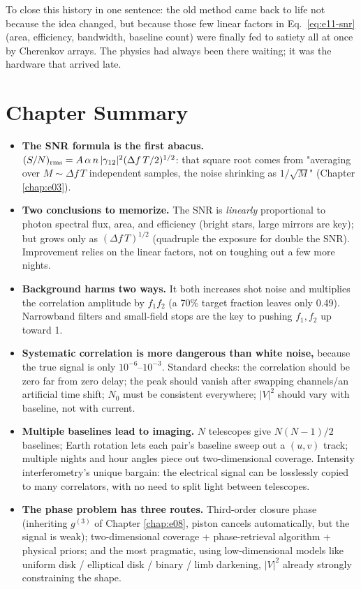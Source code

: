 To close this history in one sentence: the old method came back to life not because the idea changed, but because those few linear factors in Eq.~\eqref{eq:e11-snr} (area, efficiency, bandwidth, baseline count) were finally fed to satiety all at once by Cherenkov arrays. The physics had always been there waiting; it was the hardware that arrived late.

\section{Chapter Summary}
\label{sec:e11-summary}

\begin{itemize}
  \item \textbf{The SNR formula is the first abacus.} \((S/N)_{\rm rms}=A\,\alpha\,n\,|\gamma_{12}|^2(\Delta f\,T/2)^{1/2}\): that square root comes from "averaging over \(M\sim\Delta f\,T\) independent samples, the noise shrinking as \(1/\sqrt{M}\)" (Chapter \ref{chap:e03}).
  \item \textbf{Two conclusions to memorize.} The SNR is \emph{linearly} proportional to photon spectral flux, area, and efficiency (bright stars, large mirrors are key); but grows only as \((\Delta f\,T)^{1/2}\) (quadruple the exposure for double the SNR). Improvement relies on the linear factors, not on toughing out a few more nights.
  \item \textbf{Background harms two ways.} It both increases shot noise and multiplies the correlation amplitude by \(f_1f_2\) (a 70\% target fraction leaves only 0.49). Narrowband filters and small-field stops are the key to pushing \(f_1,f_2\) up toward 1.
  \item \textbf{Systematic correlation is more dangerous than white noise,} because the true signal is only \(10^{-6}\)--\(10^{-3}\). Standard checks: the correlation should be zero far from zero delay; the peak should vanish after swapping channels/an artificial time shift; \(N_0\) must be consistent everywhere; \(|V|^2\) should vary with baseline, not with current.
  \item \textbf{Multiple baselines lead to imaging.} \(N\) telescopes give \(N(N-1)/2\) baselines; Earth rotation lets each pair's baseline sweep out a \((u,v)\) track; multiple nights and hour angles piece out two-dimensional coverage. Intensity interferometry's unique bargain: the electrical signal can be losslessly copied to many correlators, with no need to split light between telescopes.
  \item \textbf{The phase problem has three routes.} Third-order closure phase (inheriting \(g^{(3)}\) of Chapter \ref{chap:e08}, piston cancels automatically, but the signal is weak); two-dimensional coverage + phase-retrieval algorithm + physical priors; and the most pragmatic, using low-dimensional models like uniform disk / elliptical disk / binary / limb darkening, \(|V|^2\) already strongly constraining the shape.

\end{itemize}
